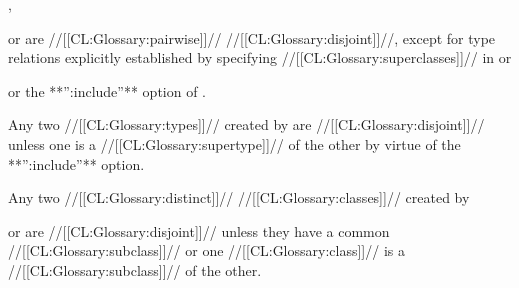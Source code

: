 ,


or  are //[[CL:Glossary:pairwise]]// //[[CL:Glossary:disjoint]]//, 
except for type relations explicitly established by specifying 
//[[CL:Glossary:superclasses]]// in  
or 


or the **'':include''** option of .

















\itemitem{\bull} Any two //[[CL:Glossary:types]]// created by  are 
//[[CL:Glossary:disjoint]]// unless
one is a //[[CL:Glossary:supertype]]// of the other by virtue of
the  **'':include''** option.








\itemitem{\bull}
Any two //[[CL:Glossary:distinct]]// //[[CL:Glossary:classes]]// created by  

or 
are //[[CL:Glossary:disjoint]]// unless they have a common //[[CL:Glossary:subclass]]// or
one //[[CL:Glossary:class]]// is a //[[CL:Glossary:subclass]]// of the other.
































